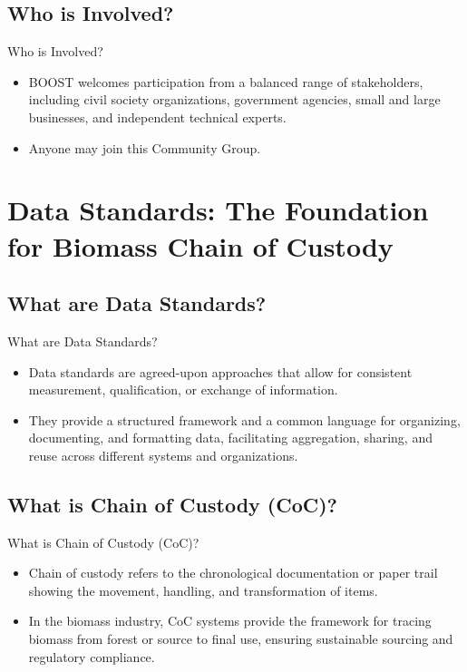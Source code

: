 \documentclass[presentation]{beamer}
\begin{document}
\subsection{Who is Involved?}
\label{sec:who-is-involved}

\begin{frame}{Who is Involved?}
\begin{itemize}
\item BOOST welcomes participation from a balanced range of stakeholders, including civil society organizations, government agencies, small and large businesses, and independent technical experts.
\item Anyone may join this Community Group.
\end{itemize}
\end{frame}

\section{Data Standards: The Foundation for Biomass Chain of Custody}
\label{sec:data-standards}

\subsection{What are Data Standards?}
\label{sec:what-are-data-standards}

\begin{frame}{What are Data Standards?}
\begin{itemize}
\item Data standards are agreed-upon approaches that allow for consistent measurement, qualification, or exchange of information.
\item They provide a structured framework and a common language for organizing, documenting, and formatting data, facilitating aggregation, sharing, and reuse across different systems and organizations.
\end{itemize}
\end{frame}

\subsection{What is Chain of Custody (CoC)?}
\label{sec:what-is-coc}

\begin{frame}{What is Chain of Custody (CoC)?}
\begin{itemize}
\item Chain of custody refers to the chronological documentation or paper trail showing the movement, handling, and transformation of items.
\item In the biomass industry, CoC systems provide the framework for tracing biomass from forest or source to final use, ensuring sustainable sourcing and regulatory compliance.
\end{itemize}
\end{frame}
\end{document}
